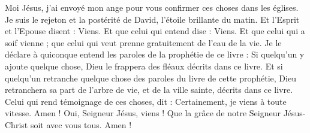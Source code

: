 \begin{multicols}{2}
Moi Jésus, j'ai envoyé mon ange{} pour vous confirmer ces choses dans les églises. Je suis le rejeton et la postérité de David, l'étoile brillante du matin.
Et l'Esprit et l'Epouse disent : Viens. Et que celui qui entend dise : Viens. Et que celui qui a soif vienne ; que celui qui veut prenne gratuitement de l'eau de la vie.
Je le déclare à quiconque entend les paroles de la prophétie de ce livre : Si quelqu'un y ajoute quelque chose, Dieu le frappera des fléaux décrits dans ce livre.
Et si quelqu'un retranche quelque chose des paroles du livre de cette prophétie, Dieu retranchera sa part de l’arbre de vie, et de la ville sainte, décrits dans ce livre.
Celui qui rend témoignage de ces choses, dit : Certainement, je viens à toute vitesse. Amen ! Oui, Seigneur Jésus, viens !
Que la grâce de notre Seigneur Jésus-Christ soit avec vous tous. Amen !
\PPE{}
\end{multicols}
